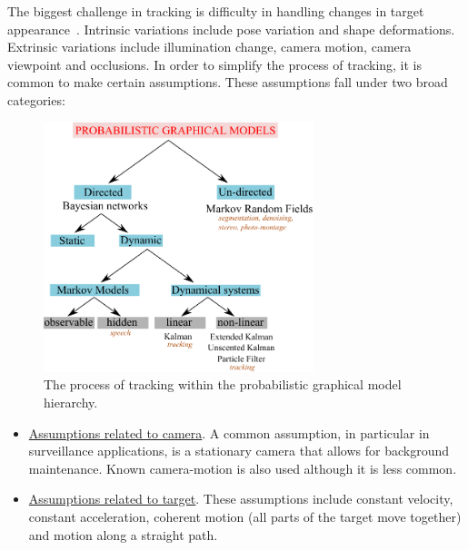 The biggest challenge in tracking is difficulty in handling changes in target appearance~\cite{2008_JNL_subspaceTRK_Ross}.  Intrinsic variations include pose variation and shape deformations.  Extrinsic variations include illumination change, camera motion, camera viewpoint and occlusions.  In order to simplify the process of tracking, it is common to make certain assumptions.  These assumptions fall under two broad categories:


								\begin{figure}[t]
								\center
								\includegraphics[width=0.7\textwidth]{thesis/PRML_PGM_overview.pdf}
								\caption{The process of tracking within the probabilistic graphical model hierarchy.}
								\label{fig:TRK_big_picture}
								\end{figure}


\begin{itemize}
\item \underline{Assumptions related to camera}.  A common assumption, in particular in surveillance applications, is a stationary camera that allows for background maintenance.  Known camera-motion is also used although it is less common.
\item \underline{Assumptions related to target}.  These assumptions include constant velocity, constant acceleration, coherent motion (all parts of the target move together) and motion along a straight path.
\end{itemize}

